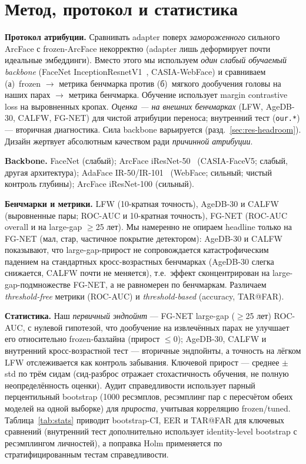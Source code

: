 \documentclass[journal]{IEEEtran}
\begin{document}
\section{Метод, протокол и статистика}\label{sec:method}
\textbf{Протокол атрибуции.} Сравнивать adapter поверх \emph{замороженного} сильного ArcFace с frozen-ArcFace некорректно (adapter лишь деформирует почти идеальные эмбеддинги). Вместо этого мы используем \emph{один слабый обучаемый backbone} (FaceNet InceptionResnetV1~\cite{schroff2015facenet}, CASIA-WebFace) и сравниваем (а)~frozen $\rightarrow$ метрика бенчмарка против (б)~мягкого дообучения головы на наших парах $\rightarrow$ метрика бенчмарка. Обучение использует margin contrastive loss на выровненных кропах. \emph{Оценка --- на внешних бенчмарках} (LFW, AgeDB-30, CALFW, FG-NET) для чистой атрибуции переноса; внутренний тест (\texttt{our.*}) --- вторичная диагностика. Сила backbone варьируется (разд.~\ref{sec:res-headroom}). Дизайн жертвует абсолютным качеством ради \emph{причинной атрибуции}.

\textbf{Backbone.} FaceNet (слабый); ArcFace iResNet-50~\cite{deng2019arcface} (CASIA-FaceV5; слабый, другая архитектура); AdaFace IR-50/IR-101~\cite{kim2022adaface} (WebFace; сильный; чистый контроль глубины); ArcFace iResNet-100 (сильный).

\textbf{Бенчмарки и метрики.} LFW (10-кратная точность), AgeDB-30 и CALFW (выровненные пары; ROC-AUC и 10-кратная точность), FG-NET (ROC-AUC overall и на large-gap $\geq$25 лет). Мы намеренно не опираем headline только на FG-NET (мал, стар, частичное покрытие детектором): AgeDB-30 и CALFW показывают, что large-gap-прирост не сопровождается катастрофическим падением на стандартных кросс-возрастных бенчмарках (AgeDB-30 слегка снижается, CALFW почти не меняется), т.е.\ эффект сконцентрирован на large-gap-подмножестве FG-NET, а не равномерен по бенчмаркам. Различаем \emph{threshold-free} метрики (ROC-AUC) и \emph{threshold-based} (accuracy, TAR@FAR).

\textbf{Статистика.} Наш \emph{первичный эндпойнт} --- FG-NET large-gap ($\geq$25 лет) ROC-AUC, с нулевой гипотезой, что дообучение на извлечённых парах не улучшает его относительно frozen-базлайна (прирост $\leq 0$); AgeDB-30, CALFW и внутренний кросс-возрастной тест --- вторичные эндпойнты, а точность на лёгком LFW отслеживается как контроль забывания. Ключевой прирост --- среднее $\pm$ std по трём сидам (сид-разброс отражает стохастичность обучения, не полную неопределённость оценки). Аудит справедливости использует парный перцентильный bootstrap (1000 ресэмплов, ресэмплинг пар с пересчётом обеих моделей на одной выборке) для \emph{прироста}, учитывая корреляцию frozen/tuned. Таблица~\ref{tab:stats} приводит bootstrap-CI, EER и TAR@FAR для ключевых сравнений (внутренний тест дополнительно использует identity-level bootstrap с ресэмплингом личностей), а поправка Holm применяется по стратифицированным тестам справедливости.
\end{document}
